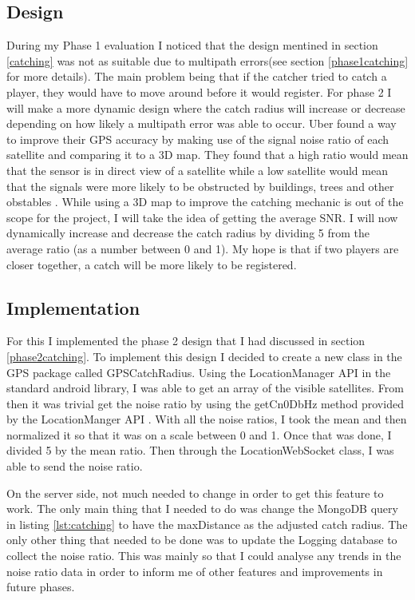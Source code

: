 \documentclass{l4proj}
\begin{document}
\subsection{Design}
\label{phase2catchingdesign}
During my Phase 1 evaluation I noticed that the design mentined in section \ref{catching} was not as suitable due to 
multipath errors(see section \ref{phase1catching} for more details). The main problem being that if the catcher tried
to catch a player, they would have to move around before it would register. For phase 2 I will make a more dynamic design
where the catch radius will increase or decrease depending on how likely a multipath error was able to occur. Uber found
a way to improve their GPS accuracy by making use of the signal noise ratio of each satellite and comparing it to a 3D map.
They found that a high ratio would mean that the sensor is in direct view of a satellite while a low satellite would mean that
the signals were more likely to be obstructed by buildings, trees and other obstables \citep{uberGPS}. While using a 3D map
to improve the catching mechanic is out of the scope for the project, I will take the idea of getting the average SNR. I will
now dynamically increase and decrease the catch radius by dividing 5 from the average ratio (as a number between 0 and 1). My hope
is that if two players are closer together, a catch will be more likely to be registered.

\subsection{Implementation}
For this I implemented the phase 2 design that I had discussed in section \ref{phase2catching}. To implement this design
I decided to create a new class in the GPS package called GPSCatchRadius. Using the LocationManager API in the standard
android library, I was able to get an array of the visible satellites. From then it was trivial
get the noise ratio by using the getCn0DbHz method provided by the LocationManger API \citep{locationManager}. With all
the noise ratios, I took the mean and then normalized it so that it was on a scale between 0 and 1. Once that was done,
I divided 5 by the mean ratio. Then through the LocationWebSocket class, I was able to send the noise ratio.

On the server side, not much needed to change in order to get this feature to work. The only main thing that I needed to
do was change the MongoDB query in listing \ref{lst:catching} to have the maxDistance as the adjusted catch radius. The
only other thing that needed to be done was to update the Logging database to collect the noise ratio. This was mainly
so that I could analyse any trends in the noise ratio data in order to inform me of other features and improvements
in future phases.
\end{document}
